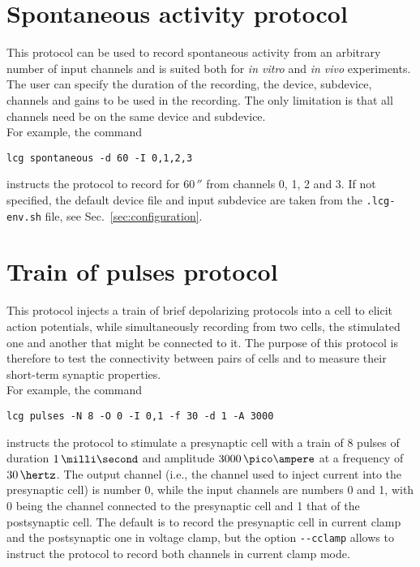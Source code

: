 \section{Spontaneous activity protocol}
This protocol can be used to record spontaneous activity from an
arbitrary number of input channels and is suited both for \emph{in
vitro} and \emph{in vivo} experiments. The user can specify the
duration of the recording, the device, subdevice, channels and gains
to be used in the recording. The only limitation is that all channels
need be on the same device and subdevice.\\
For example, the command
\begin{lstlisting}
lcg spontaneous -d 60 -I 0,1,2,3
\end{lstlisting}
instructs the protocol to record for $60\,\second$ from channels 0, 1,
2 and 3. If not specified, the default device file and input subdevice
are taken from the \verb+.lcg-env.sh+ file, see
Sec.~\ref{sec:configuration}.

\section{Train  of pulses protocol}
This protocol injects a train of brief depolarizing protocols into a
cell to elicit action potentials, while simultaneously recording from
two cells, the stimulated one and another that might be connected to
it. The purpose of this protocol is therefore to test the connectivity
between pairs of cells and to measure their short-term synaptic
properties.\\
For example, the command
\begin{lstlisting}
lcg pulses -N 8 -O 0 -I 0,1 -f 30 -d 1 -A 3000
\end{lstlisting}
instructs the protocol to stimulate a presynaptic cell with a train of
8 pulses of duration $1\,\milli\second$ and amplitude
$3000\,\pico\ampere$ at a frequency of $30\,\hertz$. The output
channel (i.e., the channel used to inject current into the presynaptic
cell) is number 0, while the input channels are numbers 0 and 1, with
0 being the channel connected to the presynaptic cell and 1 that of
the postsynaptic cell. The default is to record the presynaptic cell
in current clamp and the postsynaptic one in voltage clamp, but the
option \verb+--cclamp+ allows to instruct the protocol to record both
channels in current clamp mode.

